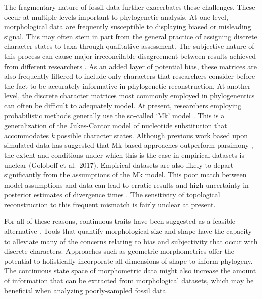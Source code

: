 \documentclass[12pt]{article}
\begin{document}
The fragmentary nature of fossil data further exacerbates these challenges.
 These occur at multiple levels important to phylogenetic analysis. At one level, morphological data are frequently susceptible to
displaying biased or misleading signal. This may often stem in part from
the general practice of assigning discrete character states to taxa
through qualitative assessment. The subjective nature of this process
can cause major irreconcilable disagreement between results achieved
from different researchers \citep{hauser1991effect,pleijel1995character,wilkinson1995comparison,
hawkins1997primary,scotland2000homology,scotland2003phylogeny,brazeau2011problematic,simoes2017giant}. As an added layer of
potential bias, these matrices are also frequently filtered to include
only characters that researchers consider before the fact to be
accurately informative in phylogenetic reconstruction. At another level,
the discrete character matrices most commonly employed in phylogenentics
can often be difficult to adequately model. At present, researchers
employing probabilistic methods generally use the so-called `Mk' model
\citep{lewis_mk}. This is a generalization of the Jukes-Cantor model of
nucleotide substitution that accommodates \emph{k} possible character
states. Although previous work based upon simulated data has suggested
that Mk-based approaches outperform parsimony \citep{wright2014bayesian},  the extent and conditions under which this is the
case in empirical datasets is unclear (Goloboff et al.~2017). Empirical
datasets are also likely to depart significantly from the assumptions of
the Mk model.  This poor match between model assumptions and data  can lead to erratic results and high uncertainty in
posterior estimates of divergence times \citep{ronquist2016closing}. The sensitivity of topological reconstruction to this frequent mismatch is fairly unclear at present. 

For all of these reasons, continuous traits have been suggested as a
feasible alternative \citep{felsenstein1973,felsenstein1988phylogenies,macleod2002phylogenetic,parins2017use}. Tools that quantify morphological size and shape have the capacity to alleviate many of the concerns relating to bias and
subjectivity that occur with discrete characters. Approaches such as
geometric morphometrics offer the potential to holistically incorporate
all dimensions of shape to inform phylogeny. The continuous state space
of morphometric data might also increase the amount of information that
can be extracted from morphological datasets, which may be beneficial
when analyzing poorly-sampled fossil data.
\end{document}
